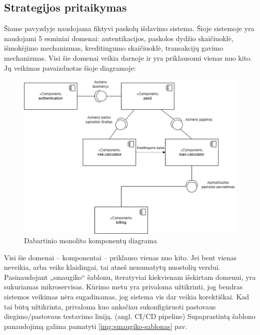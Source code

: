 \documentclass[fleqn]{VUMIFPSkursinis}
\begin{document}
\subsection{Strategijos pritaikymas}
Šiame pavyzdyje naudojama fiktyvi paskolų išdavimo sistema. Šioje sistemoje yra naudojami 5 esminiai domenai: autentikacijos, paskolos dydžio skaičiuoklė, išmokėjimo mechanizmas, kreditingumo skaičiuoklė, transakcijų gavimo mechanizmas. Visi šie domenai veikia darnoje ir yra priklausomi vienas nuo kito. Jų veikimas pavaizduotas šioje diagramoje:
\begin{figure}[H]
    \centering
    \includegraphics[scale=0.9]{img/komponentu-diagrama.png}
    \caption{Dabartinio monolito komponentų diagrama}
    \label{img:komponentu-diagrama}
\end{figure}

Visi šie domenai – komponentai – priklauso vienas nuo kito. Jei bent vienas neveikia, arba veiks klaidingai, tai atneš nenumatytų nuostolių verslui. Pasinaudojant „smaugiko“ šablonu, iteratyviai kiekvienam išskirtam domenui, yra sukuriamas mikroservisas. Kūrimo metu yra privaloma užtikrinti, jog bendras sistemos veikimas nėra sugadinamas, jog sistema vis dar veikia korektiškai. Kad tai būtų užtikrinta, privaloma kuo anksčiau sukonfigūruoti pastovaus diegimo/pastovaus testavimo liniją. (angl. CI/CD pipeline)  Supaprastintą šablono panaudojimą galima pamatyti \ref{img:smaugiko-sablonas} pav.
\end{document}
